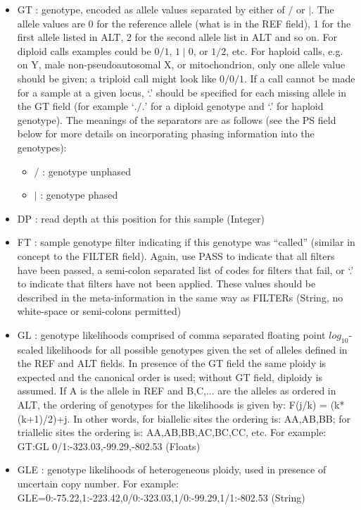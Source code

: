 \documentclass[8pt]{article}
\begin{document}
\begin{itemize}
\renewcommand{\labelitemii}{$\circ$}
  \item GT : genotype, encoded as allele values separated by either of $/$ or $\mid$. The allele values are 0 for the reference allele (what is in the REF field), 1 for the first allele listed in ALT, 2 for the second allele list in ALT and so on. For diploid calls examples could be $0/1$, $1\mid0$, or $1/2$, etc. For haploid calls, e.g. on Y, male non-pseudoautosomal X, or mitochondrion, only one allele value should be given; a triploid call might look like $0/0/1$. If a call cannot be made for a sample at a given locus, `.' should be specified for each missing allele in the GT field (for example `$./.$' for a diploid genotype and `.' for haploid genotype). The meanings of the separators are as follows (see the PS field below for more details on incorporating phasing information into the genotypes):
	\begin{itemize}
	  \item $/$ : genotype unphased
	  \item $\mid$ : genotype phased
	\end{itemize}
  \item DP : read depth at this position for this sample (Integer)
  \item FT : sample genotype filter indicating if this genotype was ``called'' (similar in concept to the FILTER field). Again, use PASS to indicate that all filters have been passed, a semi-colon separated list of codes for filters that fail, or `.' to indicate that filters have not been applied. These values should be described in the meta-information in the same way as FILTERs (String, no white-space or semi-colons permitted)
  \item GL : genotype likelihoods comprised of comma separated floating point $log_{10}$-scaled likelihoods for all possible genotypes given the set of alleles defined in the REF and ALT fields. In presence of the GT field the same ploidy is expected and the canonical order is used; without GT field, diploidy is assumed. If A is the allele in REF and B,C,... are the alleles as ordered in ALT, the ordering of genotypes for the likelihoods is given by: F(j/k) = (k*(k+1)/2)+j.  In other words, for biallelic sites the ordering is: AA,AB,BB; for triallelic sites the ordering is: AA,AB,BB,AC,BC,CC, etc.  For example: GT:GL 0/1:-323.03,-99.29,-802.53 (Floats)
  \item GLE : genotype likelihoods of heterogeneous ploidy, used in presence of uncertain copy number. For example: GLE=0:-75.22,1:-223.42,0/0:-323.03,1/0:-99.29,1/1:-802.53 (String)

\end{itemize}
\end{document}
